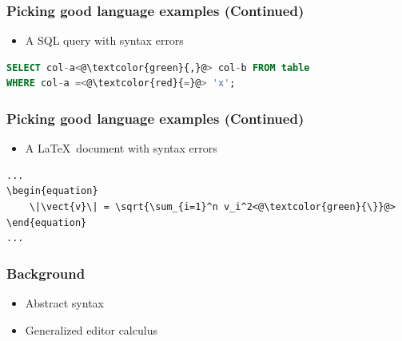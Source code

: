 \documentclass[t,24pt,aspectratio=169]{beamer}
\begin{document}
\begin{frame}[fragile]
    \frametitle{Picking good language examples (Continued)}

    \begin{multicols}{2}
        \begin{itemize}
            \item A SQL query with syntax errors

        \end{itemize}

        \columnbreak

        \begin{lstlisting}[language=sql]
SELECT col-a<@\textcolor{green}{,}@> col-b FROM table
WHERE col-a =<@\textcolor{red}{=}@> 'x';
        \end{lstlisting}
    \end{multicols}
\end{frame}

\begin{frame}[fragile]
    \frametitle{Picking good language examples (Continued)}

    \begin{multicols*}{2}
        \begin{itemize}
            \item A \LaTeX \ document with syntax errors
        \end{itemize}

        \columnbreak

        \begin{lstlisting}[basicstyle=\tiny\ttfamily]
...
\begin{equation}
    \|\vect{v}\| = \sqrt{\sum_{i=1}^n v_i^2<@\textcolor{green}{\}}@>
\end{equation}
...
        \end{lstlisting}
    \end{multicols*}
\end{frame}

\begin{frame}
    \frametitle{Background}
    \begin{itemize}
        \item Abstract syntax
        \item Generalized editor calculus
    \end{itemize}
\end{frame}
\end{document}
